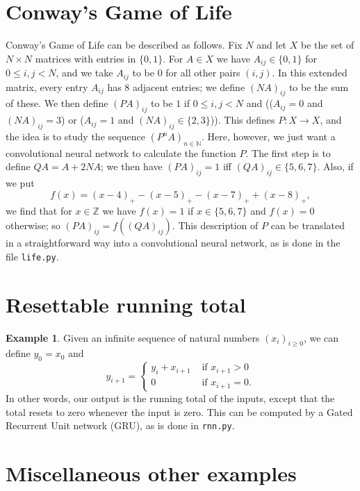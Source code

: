\documentclass{amsart}
\newcommand{\N}         {{\mathbb{N}}}
\newcommand{\Z}         {{\mathbb{Z}}}
\newcommand{\tm}        {\times}
\renewcommand{\:}{\colon}
\theoremstyle{definition}
\newtheorem{example}[theorem]{Example}
\begin{document}
\section{Conway's Game of Life}

Conway's Game of Life can be described as follows.  Fix $N$ and let
$X$ be the set of $N\tm N$ matrices with entries in $\{0,1\}$.  For
$A\in X$ we have $A_{ij}\in\{0,1\}$ for $0\leq i,j<N$, and we take
$A_{ij}$ to be $0$ for all other pairs $(i,j)$.  In this extended
matrix, every entry $A_{ij}$ has $8$ adjacent entries; we define
$(NA)_{ij}$ to be the sum of these.  We then define $(PA)_{ij}$ to be
$1$ if $0\leq i,j<N$ and (($A_{ij}=0$ and $(NA)_{ij}=3$) or  
($A_{ij}=1$ and $(NA)_{ij}\in\{2,3\}$)).  This defines $P\:X\to X$,
and the idea is to study the sequence $(P^nA)_{n\in\N}$.  Here,
however, we just want a convolutional neural network to calculate the
function $P$.  The first step is to define $QA=A+2NA$; we then have
$(PA)_{ij}=1$ iff $(QA)_{ij}\in\{5,6,7\}$.  Also, if we put 
\[ f(x)=(x-4)_+ - (x-5)_+ - (x-7)_+ + (x-8)_+,\]
we find that for $x\in\Z$ we have $f(x)=1$ if $x\in\{5,6,7\}$ and
$f(x)=0$ otherwise; so $(PA)_{ij}=f((QA)_{ij})$.  This description of
$P$ can be translated in a straightforward way into a convolutional
neural network, as is done in the file \texttt{life.py}.

\section{Resettable running total}

\begin{example}\label{eg-running}
 Given an infinite sequence of natural numbers $(x_i)_{i\geq 0}$, we
 can define $y_0=x_0$ and 
 \[ y_{i+1} = \begin{cases}
     y_i+x_{i+1} & \text{ if } x_{i+1} > 0 \\
     0 & \text{ if } x_{i+1} = 0.
    \end{cases}
 \]
 In other words, our output is the running total of the inputs, except
 that the total resets to zero whenever the input is zero.  This can
 be computed by a Gated Recurrent Unit network (GRU), as is done in
 \texttt{rnn.py}. 
\end{example}

\section{Miscellaneous other examples}
\end{document}
